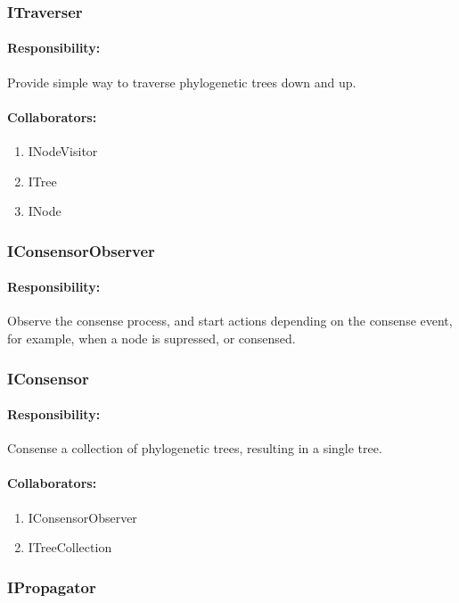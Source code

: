 \documentclass[a4paper,10pt]{article}
\begin{document}
  \subsubsection{ITraverser}
    \paragraph{Responsibility:} Provide simple way to traverse phylogenetic trees down and up.
    \paragraph{Collaborators:}
      \begin{enumerate}
       \item INodeVisitor
	 \item ITree
	 \item INode
      \end{enumerate}

  \subsubsection{IConsensorObserver}
    \paragraph{Responsibility:} Observe the consense process, and start actions depending on the consense event, for example, when a node is supressed, or consensed.

  \subsubsection{IConsensor}
    \paragraph{Responsibility:} Consense a collection of phylogenetic trees, resulting in a single tree.
    \paragraph{Collaborators:}
      \begin{enumerate}
       \item IConsensorObserver
	 \item ITreeCollection
      \end{enumerate}

  \subsubsection{IPropagator}
\end{document}
